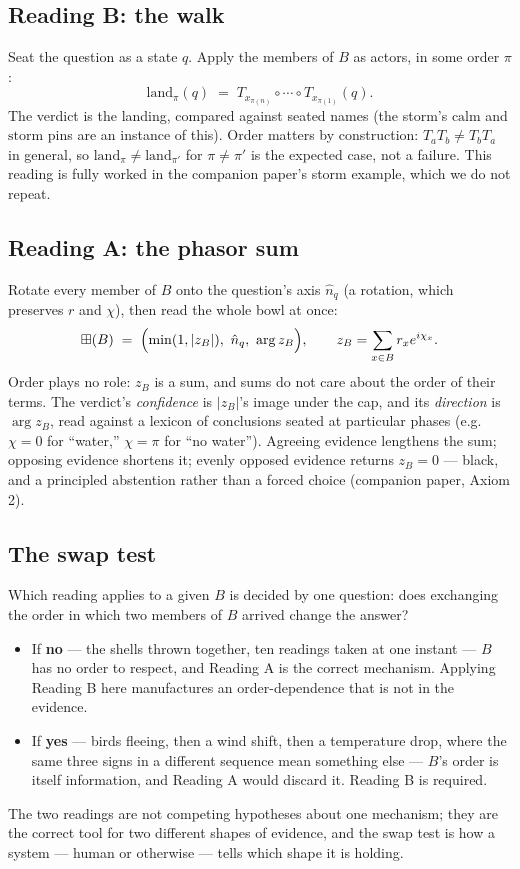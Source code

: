 \documentclass[12pt, a4paper]{article}
\begin{document}
\subsection{Reading B: the walk}
Seat the question as a state $q$. Apply the members of $B$ as actors,
in some order $\pi$:
\[
    \mathrm{land}_\pi(q) \;=\; T_{x_{\pi(n)}}\circ\cdots\circ
    T_{x_{\pi(1)}}(q).
\]
The verdict is the landing, compared against seated names (the storm's
$\mathrm{calm}$ and $\mathrm{storm}$ pins are an instance of this).
Order matters by construction: $T_a T_b\neq T_b T_a$ in general, so
$\mathrm{land}_\pi \neq \mathrm{land}_{\pi'}$ for $\pi\neq\pi'$ is the
expected case, not a failure. This reading is fully worked in the
companion paper's storm example, which we do not repeat.

\subsection{Reading A: the phasor sum}
Rotate every member of $B$ onto the question's axis $\hat n_q$ (a
rotation, which preserves $r$ and $\chi$), then read the whole bowl at
once:
\[
    \boxplus(B) \;=\; \Bigl(\min(1,|z_B|),\ \hat n_q,\ \arg z_B\Bigr),
    \qquad
    z_B=\sum_{x\in B} r_x e^{i\chi_x}.
\]
Order plays no role: $z_B$ is a sum, and sums do not care about the
order of their terms. The verdict's \emph{confidence} is $|z_B|$'s
image under the cap, and its \emph{direction} is $\arg z_B$, read
against a lexicon of conclusions seated at particular phases (e.g.\
$\chi=0$ for ``water,'' $\chi=\pi$ for ``no water''). Agreeing evidence
lengthens the sum; opposing evidence shortens it; evenly opposed
evidence returns $z_B=0$ --- black, and a principled abstention rather
than a forced choice (companion paper, Axiom 2).

\subsection{The swap test}
\label{subsec:swap_test}
Which reading applies to a given $B$ is decided by one question: does
exchanging the order in which two members of $B$ arrived change the
answer?
\begin{itemize}
\item If \textbf{no} --- the shells thrown together, ten readings
      taken at one instant --- $B$ has no order to respect, and
      Reading A is the correct mechanism. Applying Reading B here
      manufactures an order-dependence that is not in the evidence.
\item If \textbf{yes} --- birds fleeing, then a wind shift, then a
      temperature drop, where the same three signs in a different
      sequence mean something else --- $B$'s order is itself
      information, and Reading A would discard it. Reading B is
      required.
\end{itemize}
The two readings are not competing hypotheses about one mechanism;
they are the correct tool for two different shapes of evidence, and
the swap test is how a system --- human or otherwise --- tells which
shape it is holding.
\end{document}
